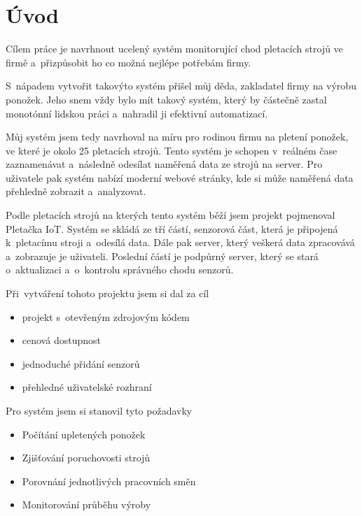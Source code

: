 \chapter*{Úvod}

Cílem práce je navrhnout ucelený systém monitorující chod pletacích strojů ve firmě a~přizpůsobit ho co možná nejlépe potřebám firmy.

S~nápadem vytvořit takovýto systém přišel můj děda, zakladatel firmy na výrobu ponožek.
Jeho snem vždy bylo mít takový systém, který by částečně zastal monotónní lidskou práci a~nahradil ji efektivní automatizací.

Můj systém jsem tedy navrhoval na míru pro rodinou firmu na pletení ponožek, ve které je okolo 25 pletacích strojů. 
Tento systém je schopen v~reálném čase zaznamenávat a~následně odesílat naměřená data ze strojů na server. 
Pro uživatele pak systém nabízí moderní webové stránky, kde si může naměřená data přehledně zobrazit a~analyzovat.

Podle pletacích strojů na kterých tento systém běží jsem projekt pojmenoval Pletačka IoT. 
Systém se skládá ze tří částí, senzorová část, která je připojená k~pletacímu stroji a~odesílá data.
Dále pak server, který veškerá data zpracovává a~zobrazuje je uživateli.
Poslední částí je podpůrný server, který se stará o~aktualizaci a~o~kontrolu správného chodu senzorů.\newline


Při~vytváření tohoto projektu jsem si dal za cíl
\begin{itemize}
    \item projekt s~otevřeným zdrojovým kódem
    \item cenová dostupnost
    \item jednoduché přidání senzorů
    \item přehledné uživatelské rozhraní
\end{itemize}

Pro systém jsem si stanovil tyto požadavky
\begin{itemize}
    \item Počítání upletených ponožek
    \item Zjišťování poruchovosti strojů
    \item Porovnání jednotlivých pracovních směn
    \item Monitorování průběhu výroby
\end{itemize}

\newpage
